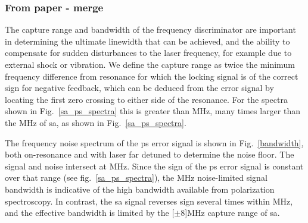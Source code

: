 \subsubsection{From paper - merge}
\label{bandwidth_section}
The capture range and bandwidth of the frequency discriminator are important in determining the ultimate linewidth that can be achieved, and the ability to compensate for sudden disturbances to the laser frequency, for example due to external shock or vibration.
We define the capture range as twice the minimum frequency difference from resonance for which the locking signal is of the correct sign for negative feedback, which can be deduced from the error signal by locating the first zero crossing to either side of the resonance.
For the spectra shown in Fig.~\ref{sa_ps_spectra} this is greater than \unit[300]{MHz}, many times larger than the \unit[16]{MHz} of \gls*{sa}, as shown in Fig.~\ref{sa_ps_spectra}.

The frequency noise spectrum of the \gls*{ps} error signal is shown in  Fig.~\ref{bandwidth}, both on-resonance and with laser far detuned to determine the noise floor.  The signal and noise intersect at \unit[83]{MHz}.
Since the sign of the \gls*{ps} error signal is constant over that range (see fig.~\ref{sa_ps_spectra}), the \unit[83]{MHz} noise-limited signal bandwidth is indicative of the high bandwidth available from polarization spectroscopy.
In contrast, the \gls*{sa} signal reverses sign several times within \unit[83]{MHz}, and the effective bandwidth is limited by the \unit[$\pm 8$]{MHz} capture range of \gls*{sa}.

